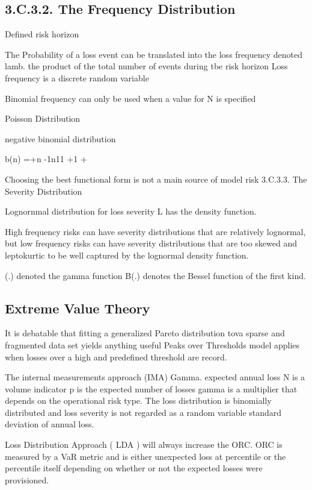 \documentclass[12pt]{article}
\begin{document}
\subsection{3.C.3.2. The Frequency Distribution}
Defined risk horizon

The Probability of a loss event can be translated into the loss frequency denoted lamb.
the product of the total number of events during tbe risk horizon
Loss frequency is a discrete random variable

Binomial frequency can only be used when a value for N is specified
 
Poisson Distribution


negative binomial distribution
 
b(n) =+n -1n11 +1 + 


Choosing the best functional form is not a main source of model risk
3.C.3.3. The Severity Distribution
 
Lognornmal distribution for loss severity L has the density function.
 
High frequency risks can have severity distributions that are relatively lognormal, but low frequency risks can have severity distributions that are too skewed and leptokurtic to be well
captured by the lognormal density function.
 
 
(.) denoted the gamma function 
B(.) denotes the Bessel function of the first kind.

\subsection{Extreme Value Theory}
 
It is debatable that fitting a generalized Pareto distribution tova sparse and fragmented data set yields anything useful
Peaks over Thresholds model applies when losses over a high and predefined threshold are record.

 The internal measurements approach
(IMA)
Gamma. expected annual loss
N is a volume indicator p is the expected number of losses gamma is a multiplier that depends on the operational risk type.
The loss distribution is binomially distributed and loss severity is not regarded as a random variable
standard deviation of annual loss.

Loss Distribution Approach ( LDA ) will always increase the ORC.
ORC is measured by a VaR metric and is either unexpected loss at percentile or the percentile itself depending on whether or not the expected losses were provisioned.
\end{document}
